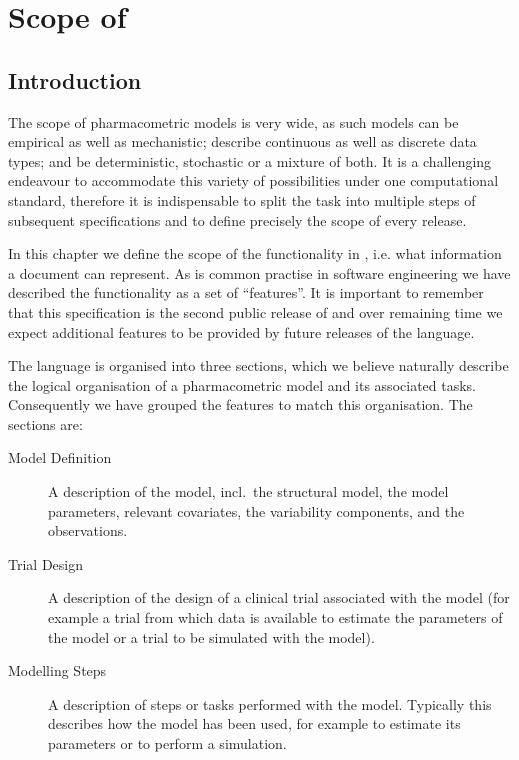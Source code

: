 
\chapter{Scope of \pharmml}
\label{chap:scope}


\section{Introduction}

The scope of pharmacometric models is very wide, as such models can be empirical as well as
mechanistic; describe continuous as well as discrete data types; and be deterministic, stochastic
or a mixture of both. It is a challenging endeavour to accommodate this variety of possibilities
under one computational standard, therefore it is indispensable to split the task into multiple
steps of subsequent specifications and to define precisely the scope of every release.

In this chapter we define the scope of the functionality in
\pharmml, i.e. what information a \pharmml document can
represent. As is common practise in software engineering we have 
described the functionality as a set of ``features''.  It is important to remember 
that this specification is the second public release of \pharmml and over remaining 
time we expect additional features to be provided by future releases of the language.

The language is organised into three sections, which we believe naturally
describe the logical organisation of a pharmacometric model and its
associated tasks. Consequently we have grouped the features to match this
organisation. The sections are:
\begin{description}
\item[Model Definition] A description of the model, incl.\ the structural model, the model
  parameters, relevant covariates, the variability components, and the observations.
\item[Trial Design] A description of the design of a clinical trial associated with the model
  (for example a trial from which data is available to estimate the parameters of the model or
  a trial to be simulated with the model).
\item[Modelling Steps] A description of steps or tasks performed with
  the model. Typically this describes how the model has been used, for
  example to estimate its parameters or to perform a simulation.
\end{description}

